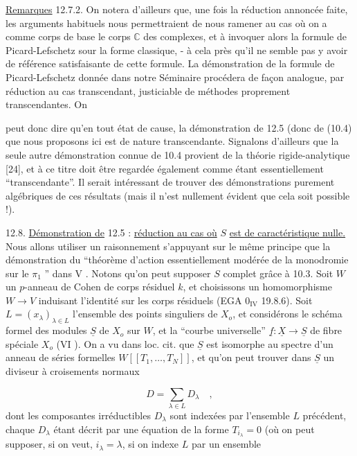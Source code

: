 \underline{Remarques} 12.7.2. On notera d'ailleurs que, une fois la réduction annoncée faite, les arguments habituels nous permettraient de nous ramener au cas où on a comme corps de base le corps $\mathbb{C}$ des complexes, et à invoquer alors la formule de Picard-Lefschetz sour la forme classique, - à cela près qu'il ne semble pas y avoir de référence satisfaisante de cette formule. La démonstration de la formule de Picard-Lefschetz donnée dans notre Séminaire procédera de façon analogue, par réduction au cas transcendant, justiciable de méthodes proprement transcendantes. On



peut donc dire qu'en tout état de cause, la démonstration de 12.5 (donc de (10.4) que nous proposons ici est de nature transcendante. Signalons d'ailleurs que la seule autre démonstration connue de 10.4 provient de la théorie rigide-analytique [24], et à ce titre doit être regardée également comme étant essentiellement ``transcendante''. Il serait intéressant de trouver des démonstrations purement algébriques de ces résultats (mais il n'est nullement évident que cela soit possible !).

12.8. \underline{Démonstration de} 12.5 : \underline{réduction au cas où} $S$ \underline{est de caractéristique nulle.} Nous allons utiliser un raisonnement s'appuyant sur le même principe que la démonstration du ``théorème d'action essentiellement modérée de la monodromie sur le $\pi_1$ '' dans V \hspace{4em}. Notons qu'on peut supposer $S$ complet grâce à 10.3. Soit $W$ un $p$-anneau de Cohen de corps résiduel $k$, et choisissons un homomorphisme $W \longrightarrow V$ induisant l'identité sur les corps résiduels (EGA $0_{\mathrm{IV}}$ 19.8.6). Soit $L = (x_\lambda)_{\lambda \in L}$ l'ensemble des points singuliers de $X_o$, et considérons le schéma formel des modules $\underline{S}$ de $X_o$ sur $W$, et la ``courbe universelle'' $\underline{f} : \underline{X} \longrightarrow \underline{S}$ de fibre spéciale $X_o$ (VI \hspace{3em}). On a vu dans loc. cit. que $\underline{S}$ est isomorphe au spectre d'un anneau de séries formelles $W[[T_1,\ldots,T_N]]$, et qu'on peut trouver dans $\underline{S}$ un diviseur à croisements normaux

\begin{equation}\tag{12.8.1}
D = \sum_{\lambda \in L} D_\lambda \quad ,
\end{equation}
dont les composantes irréductibles $D_\lambda$ sont indexées par l'ensemble $L$ précédent, chaque $D_\lambda$ étant décrit par une équation de la forme $T_{i_\lambda} = 0$ (où on peut supposer, si on veut, $i_\lambda = \lambda$, si on indexe $L$ par un ensemble


